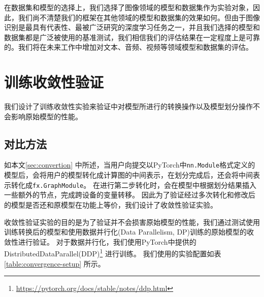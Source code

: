 在数据集和模型的选择上，我们选择了图像领域的模型和数据集作为实验对象，因此，我们尚不清楚我们的框架在其他领域的模型和数据集的效果如何。但由于图像识别是最具有代表性、最被广泛研究的深度学习任务之一，并且我们选择的模型和数据集都是广泛被使用的基准测试，我们相信我们的评估结果在一定程度上是可靠的。我们将在未来工作中增加对文本、音频、视频等领域模型和数据集的评估。


\section{训练收敛性验证}
\label{sec:convergence}
我们设计了训练收敛性实验来验证\sys{}中对模型所进行的转换操作以及模型划分操作不会影响原始模型的性能。

\subsection{对比方法}


如本文\ref{sec:convertion} 中所述，当用户向\sys{}提交以PyTorch中\texttt{nn.Module}格式定义的模型后，\sys{}会将用户的模型转化成计算图的中间表示，在划分完成后，\sys{}还会将中间表示转化成\texttt{fx.GraphModule}。
在进行第二步转化时，会在模型中根据划分结果插入一些额外的节点，完成跨设备的变量转移。
因此为了验证经过多次转化和修改后的模型是否还和原模型在功能上等价，我们设计了收敛性验证实验。

收敛性验证实验的目的是为了验证\sys{}并不会损害原始模型的性能，我们通过测试使用\sys{}训练转换后的模型和使用数据并行化(Data Parallelism, DP)训练的原始模型的收敛性进行验证。
对于数据并行化，我们使用PyTorch中提供的DistributedDataParallel(DDP)\footnote{\url{https://pytorch.org/docs/stable/notes/ddp.html}} 进行训练。
我们使用的实验配置如表\ref{table:convergence-setup} 所示。



